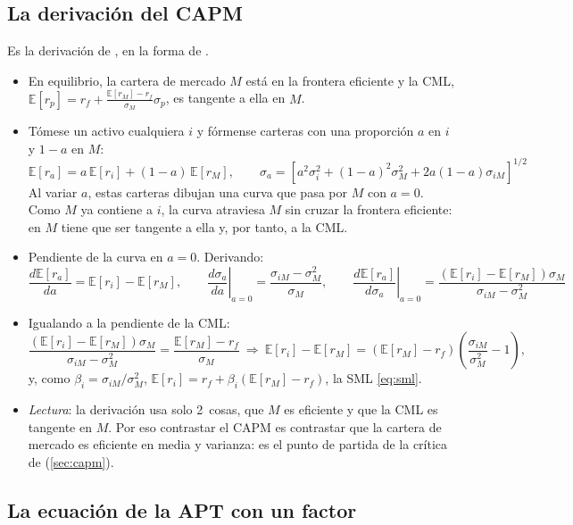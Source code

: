 \documentclass[11pt]{article}
\begin{document}
\subsection{La derivación del CAPM}\label{anexo:capm-derivacion}

Es la derivación de \textcite{Sharpe1964Capital}, en la forma de \textcite[cap.~9]{BodieKaneMarcus2021Investments}.
\begin{itemize}
\item En equilibrio, la cartera de mercado $M$ está en la frontera eficiente y la CML, $\mathbb{E}[r_p]=r_f+\frac{\mathbb{E}[r_M]-r_f}{\sigma_M}\sigma_p$, es tangente a ella en $M$.
\item Tómese un activo cualquiera $i$ y fórmense carteras con una proporción $a$ en $i$ y $1-a$ en $M$:
  \[
  \mathbb{E}[r_a]=a\,\mathbb{E}[r_i]+(1-a)\,\mathbb{E}[r_M],\qquad \sigma_a=\left[a^2\sigma_i^2+(1-a)^2\sigma_M^2+2a(1-a)\sigma_{iM}\right]^{1/2}
  \]
  Al variar $a$, estas carteras dibujan una curva que pasa por $M$ con $a=0$. Como $M$ ya contiene a $i$, la curva atraviesa $M$ sin cruzar la frontera eficiente: en $M$ tiene que ser tangente a ella y, por tanto, a la CML.
\item Pendiente de la curva en $a=0$. Derivando:
  \[
  \frac{d\mathbb{E}[r_a]}{da}=\mathbb{E}[r_i]-\mathbb{E}[r_M],\qquad \left.\frac{d\sigma_a}{da}\right|_{a=0}=\frac{\sigma_{iM}-\sigma_M^2}{\sigma_M},\qquad \left.\frac{d\mathbb{E}[r_a]}{d\sigma_a}\right|_{a=0}=\frac{\left(\mathbb{E}[r_i]-\mathbb{E}[r_M]\right)\sigma_M}{\sigma_{iM}-\sigma_M^2}
  \]
\item Igualando a la pendiente de la CML:
  \[
  \frac{\left(\mathbb{E}[r_i]-\mathbb{E}[r_M]\right)\sigma_M}{\sigma_{iM}-\sigma_M^2}=\frac{\mathbb{E}[r_M]-r_f}{\sigma_M}\ \Rightarrow\ \mathbb{E}[r_i]-\mathbb{E}[r_M]=\left(\mathbb{E}[r_M]-r_f\right)\left(\frac{\sigma_{iM}}{\sigma_M^2}-1\right),
  \]
  y, como $\beta_i=\sigma_{iM}/\sigma_M^2$, $\mathbb{E}[r_i]=r_f+\beta_i\left(\mathbb{E}[r_M]-r_f\right)$, la SML \eqref{eq:sml}. \findemo
\item \emph{Lectura}: la derivación usa solo 2~cosas, que $M$ es eficiente y que la CML es tangente en $M$. Por eso contrastar el CAPM es contrastar que la cartera de mercado es eficiente en media y varianza: es el punto de partida de la crítica de  (\ref{sec:capm}).
\end{itemize}

\subsection{La ecuación de la APT con un factor}\label{anexo:apt-derivacion}
\end{document}
